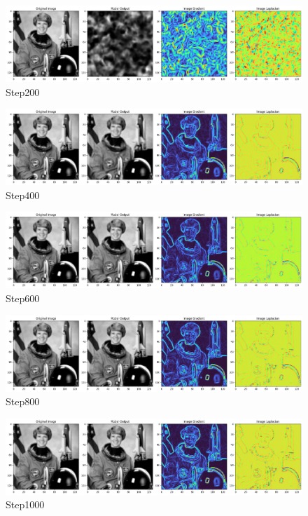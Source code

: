 \documentclass[12pt]{article}
\begin{document}
\begin{figure}[h]
    \centering 
    \includegraphics[width=1.0\textwidth]{training_plot1.png}
    \caption{Step200}
\end{figure}
\begin{figure}[h]
    \centering 
    \includegraphics[width=1.0\textwidth]{training_plot2.png}
    \caption{Step400}
\end{figure}
\begin{figure}[h]
    \centering 
    \includegraphics[width=1.0\textwidth]{training_plot3.png}
    \caption{Step600}
\end{figure}
\begin{figure}[h]
    \centering 
    \includegraphics[width=1.0\textwidth]{training_plot4.png}
    \caption{Step800}
\end{figure}
\begin{figure}[h]
    \centering 
    \includegraphics[width=1.0\textwidth]{training_plot5.png}
    \caption{Step1000}
\end{figure}
\end{document}
